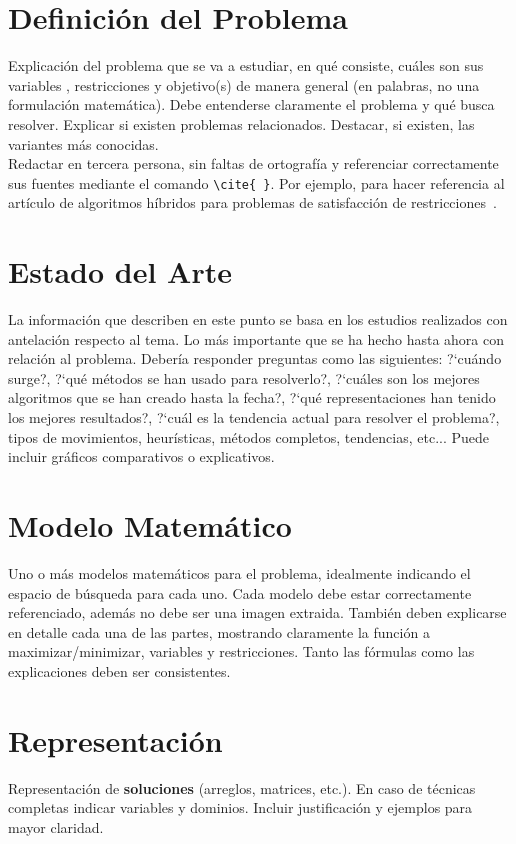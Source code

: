 \documentclass[letter, 10pt]{article}
\begin{document}
\section{Definici\'on del Problema}
Explicaci\'on del problema que se va a estudiar, en qu\'e consiste, cu\'ales son sus variables , restricciones y objetivo(s) de manera general (en palabras, no una formulaci\'on matem\'atica). Debe entenderse claramente el problema y qu\'e busca resolver.
Explicar si existen problemas relacionados.
Destacar, si existen, las variantes m\'as conocidas.\\
Redactar en tercera persona, sin faltas de ortograf\'ia y referenciar correctamente sus fuentes mediante el comando  \verb+\cite{ }+. Por ejemplo, para hacer referencia al art\'iculo de algoritmos h\'ibridos para problemas de satisfacci\'on de restricciones~\cite{Prosser93Hybrid}.

\section{Estado del Arte}
La informaci\'on que describen en este punto se basa en los estudios realizados con antelaci\'on respecto al tema.
Lo m\'as importante que se ha hecho hasta ahora con relaci\'on al problema. Deber\'ia responder preguntas como las siguientes:
?`cu\'ando surge?, ?`qu\'e m\'etodos se han usado para resolverlo?, ?`cu\'ales son los mejores algoritmos que se han creado hasta
la fecha?, ?`qu\'e representaciones han tenido los mejores resultados?, ?`cu\'al es la tendencia actual para resolver el problema?, tipos de movimientos, heur\'isticas, m\'etodos completos, tendencias, etc... Puede incluir gr\'aficos comparativos o explicativos.\\

\section{Modelo Matem\'atico}
Uno o m\'as modelos matem\'aticos para el problema, idealmente indicando el espacio de b\'usqueda para cada uno. Cada modelo debe estar correctamente referenciado, adem\'as no debe ser una imagen extraida. Tambi\'en deben explicarse en detalle cada una de las partes, mostrando claramente la funci\'on a maximizar/minimizar, variables y restricciones. Tanto las f\'ormulas como las explicaciones deben ser consistentes.

\section{Representaci\'on}
Representaci\'on de \textbf{soluciones} (arreglos, matrices, etc.). En caso de t\'ecnicas completas indicar variables y dominios. Incluir justificaci\'on y ejemplos para mayor claridad.
\end{document}
